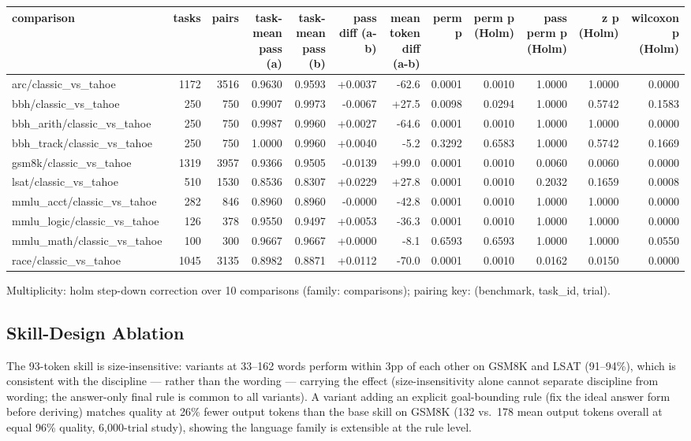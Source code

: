 \documentclass[11pt,a4paper]{article}
\begin{document}
\begin{tabular}{@{}l r r r r r r r r r r r@{}}
\toprule
comparison & tasks & pairs & task-mean pass (a) & task-mean pass (b) & pass diff (a-b) & mean token diff (a-b) & perm p & perm p (Holm) & pass perm p (Holm) & z p (Holm) & wilcoxon p (Holm) \\
\midrule
arc/classic\_vs\_tahoe & 1172 & 3516 & 0.9630 & 0.9593 & +0.0037 & -62.6 & 0.0001 & 0.0010 & 1.0000 & 1.0000 & 0.0000 \\
bbh/classic\_vs\_tahoe & 250 & 750 & 0.9907 & 0.9973 & -0.0067 & +27.5 & 0.0098 & 0.0294 & 1.0000 & 0.5742 & 0.1583 \\
bbh\_arith/classic\_vs\_tahoe & 250 & 750 & 0.9987 & 0.9960 & +0.0027 & -64.6 & 0.0001 & 0.0010 & 1.0000 & 1.0000 & 0.0000 \\
bbh\_track/classic\_vs\_tahoe & 250 & 750 & 1.0000 & 0.9960 & +0.0040 & -5.2 & 0.3292 & 0.6583 & 1.0000 & 0.5742 & 0.1669 \\
gsm8k/classic\_vs\_tahoe & 1319 & 3957 & 0.9366 & 0.9505 & -0.0139 & +99.0 & 0.0001 & 0.0010 & 0.0060 & 0.0060 & 0.0000 \\
lsat/classic\_vs\_tahoe & 510 & 1530 & 0.8536 & 0.8307 & +0.0229 & +27.8 & 0.0001 & 0.0010 & 0.2032 & 0.1659 & 0.0008 \\
mmlu\_acct/classic\_vs\_tahoe & 282 & 846 & 0.8960 & 0.8960 & -0.0000 & -42.8 & 0.0001 & 0.0010 & 1.0000 & 1.0000 & 0.0000 \\
mmlu\_logic/classic\_vs\_tahoe & 126 & 378 & 0.9550 & 0.9497 & +0.0053 & -36.3 & 0.0001 & 0.0010 & 1.0000 & 1.0000 & 0.0000 \\
mmlu\_math/classic\_vs\_tahoe & 100 & 300 & 0.9667 & 0.9667 & +0.0000 & -8.1 & 0.6593 & 0.6593 & 1.0000 & 1.0000 & 0.0550 \\
race/classic\_vs\_tahoe & 1045 & 3135 & 0.8982 & 0.8871 & +0.0112 & -70.0 & 0.0001 & 0.0010 & 0.0162 & 0.0150 & 0.0000 \\
\bottomrule
\end{tabular}

Multiplicity: holm step-down correction over 10 comparisons (family: comparisons); pairing key: (benchmark, task\_id, trial).
\endgroup

\subsection{Skill-Design Ablation}

The 93-token skill is size-insensitive: variants at 33--162 words perform within 3pp of each other on GSM8K and LSAT (91--94\%), which is consistent with the discipline --- rather than the wording --- carrying the effect (size-insensitivity alone cannot separate discipline from wording; the answer-only final rule is common to all variants). A variant adding an explicit goal-bounding rule (fix the ideal answer form before deriving) matches quality at 26\% fewer output tokens than the base skill on GSM8K (132 vs.\ 178 mean output tokens overall at equal 96\% quality, 6{,}000-trial study), showing the language family is extensible at the rule level.
\end{document}
